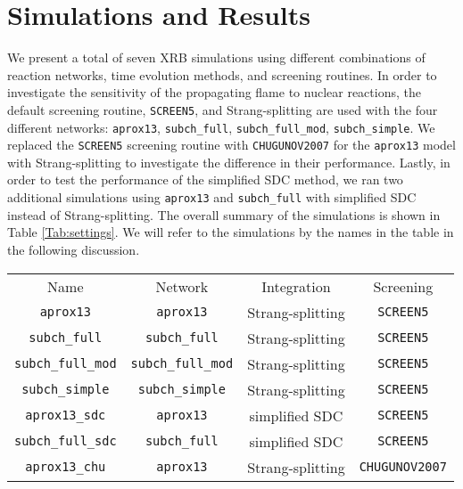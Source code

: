 \documentclass[preprint,times,tighten]{aastex631}
\begin{document}
\section{Simulations and Results}\label{Sec:results}

We present a total of seven XRB simulations using different combinations of reaction networks, time evolution methods, and screening routines. In order to investigate the sensitivity of the propagating flame to nuclear reactions, the default screening routine, {\tt SCREEN5}, and Strang-splitting are used with the four different networks: {\tt aprox13}, {\tt subch\_full}, {\tt subch\_full\_mod}, {\tt subch\_simple}. We replaced the {\tt SCREEN5} screening routine with {\tt CHUGUNOV2007} for the {\tt aprox13} model with Strang-splitting to investigate the difference in their performance. Lastly, in order to test the performance of the simplified SDC method, we ran two additional simulations using {\tt aprox13} and {\tt subch\_full} with simplified SDC instead of Strang-splitting. The overall summary of the simulations is shown in Table \ref{Tab:settings}.  We will
refer to the simulations by the names in the table
in the following discussion.


\begin{table*}
\caption{\label{Tab:settings}
Various settings used for each simulation.
}
\begin{ruledtabular}
\begin{tabular}{cccc}
Name &
Network &
Integration &
Screening
\\ 

\colrule

{\tt aprox13} & {\tt aprox13} & Strang-splitting & {\tt SCREEN5} \\
{\tt subch\_full} & {\tt subch\_full} & Strang-splitting & {\tt SCREEN5} \\
{\tt subch\_full\_mod} & {\tt subch\_full\_mod} & Strang-splitting & {\tt SCREEN5} \\
{\tt subch\_simple} & {\tt subch\_simple} & Strang-splitting & {\tt SCREEN5} \\
{\tt aprox13\_sdc} & {\tt aprox13} & simplified SDC & {\tt SCREEN5} \\
{\tt subch\_full\_sdc} & {\tt subch\_full} & simplified SDC & {\tt SCREEN5} \\
{\tt aprox13\_chu} & {\tt aprox13} & Strang-splitting & {\tt CHUGUNOV2007} 

\end{tabular}
\end{ruledtabular}
\end{table*}
\end{document}
